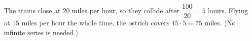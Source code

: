 The trains close at $20$ miles per hour, so they collide after $\dfrac{100}{20}=5$ hours. Flying at $15$ miles per hour the whole time, the ostrich covers $15\cdot5=\boxed{75}$ miles. (No infinite series is needed.)

